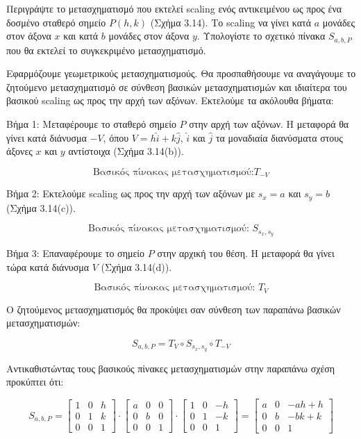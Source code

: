 \begin{example}
Περιγράψτε το μετασχηματισμό που εκτελεί scaling ενός αντικειμένου ως προς ένα δοσμένο σταθερό σημείο $P(h,k)$ (Σχήμα 3.14). Το scaling να γίνει κατά $a$ μονάδες στον άξονα $x$ και κατά $b$ μονάδες στον άξονα $y$. Υπολογίστε το σχετικό πίνακα $S_{a,b,P}$ που θα εκτελεί το συγκεκριμένο μετασχηματισμό.
\end{example}
\begin{solution}

	
%

Εφαρμόζουμε γεωμετρικούς μετασχηματισμούς. Θα προσπαθήσουμε να αναγάγουμε το ζητούμενο μετασχηματισμό σε σύνθεση βασικών μετασχηματισμών και ιδιαίτερα του βασικού scaling ως προς την αρχή των αξόνων. Εκτελούμε τα ακόλουθα βήματα:

Βήμα 1: Μεταφέρουμε το σταθερό σημείο $P$ στην αρχή των αξόνων. Η μεταφορά θα γίνει κατά διάνυσμα $-V$, όπου $V = h\hat{i} + k\hat{j}$, $\hat{i}$ και $\hat{j}$ τα μοναδιαία διανύσματα στους άξονες $x$ και $y$ αντίστοιχα (Σχήμα 3.14(b)).



\[
\text{Βασικός πίνακας μετασχηματισμού:} T_{-V}
\]

Βήμα 2: Εκτελούμε scaling ως προς την αρχή των αξόνων με $s_x = a$ και $s_y = b$ (Σχήμα 3.14(c)).

\[
\text{Βασικός πίνακας μετασχηματισμού: } S_{s_x, s_y}
\]

Βήμα 3: Επαναφέρουμε το σημείο $P$ στην αρχική του θέση. Η μεταφορά θα γίνει τώρα κατά διάνυσμα $V$ (Σχήμα 3.14(d)).

\[
\text{Βασικός πίνακας μετασχηματισμού: } T_V
\]

Ο ζητούμενος μετασχηματισμός θα προκύψει σαν σύνθεση των παραπάνω βασικών μετασχηματισμών:

\[
S_{a,b,P} = T_V \circ S_{s_x, s_y} \circ T_{-V}
\]

Αντικαθιστώντας τους βασικούς πίνακες μετασχηματισμών στην παραπάνω σχέση προκύπτει ότι:

\[
S_{a,b,P} =
\begin{bmatrix}
1 & 0 & h \\
0 & 1 & k \\
0 & 0 & 1
\end{bmatrix}
\cdot
\begin{bmatrix}
a & 0 & 0 \\
0 & b & 0 \\
0 & 0 & 1
\end{bmatrix}
\cdot
\begin{bmatrix}
1 & 0 & -h \\
0 & 1 & -k \\
0 & 0 & 1
\end{bmatrix}
=
\begin{bmatrix}
a & 0 & -ah + h \\
0 & b & -bk + k \\
0 & 0 & 1
\end{bmatrix}
\]


\end{solution}
